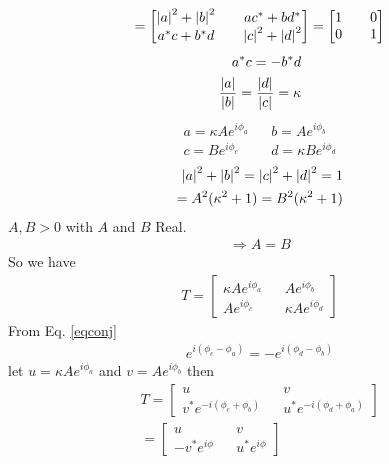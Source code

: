 \documentclass[12pt]{article}
\begin{document}
\begin{equation}
=\begin{bmatrix}
\abs{a}^2 + \abs{b}^2 && ac^*+bd^*\\
a^*c +b^*d && \abs{c}^2+\abs{d}^2
\end{bmatrix}=
\begin{bmatrix}
1 && 0\\
0 && 1
\end{bmatrix}
\end{equation}
\begin{align}
\label{eqconj}
a^*c = -b^*d\\
\frac{\abs{a}}{\abs{b}} = \frac{\abs{d}}{\abs{c}} = \kappa \\
\end{align}
\begin{align}
a = \kappa A e^{i \phi_a} && b = A e^{i \phi_b}\\
c =  B e^{i \phi_c} && d = \kappa B e^{i \phi_d}
\end{align}
\begin{align}
\abs{a}^2+\abs{b}^2 = \abs{c}^2 + \abs{d}^2 = 1\\
= A^2 (\kappa^2 + 1) = B^2(\kappa^2 + 1)\\
\end{align}
$A,B>0$ with $A$ and $B$ Real.
\begin{align}
\Rightarrow A = B
\end{align}
So we have
\begin{align}
T=
\begin{bmatrix}
\kappa A e^{i\phi_a} && A e^{i \phi_b}\\
A e^{i \phi_c} && \kappa A e^{i \phi_d}
\end{bmatrix}
\end{align}
From Eq. \ref{eqconj}
\begin{align}
e^{i(\phi_c-\phi_a)} = -e^{i(\phi_d-\phi_b)}
\end{align}
let $u=\kappa A e^{i\phi_a}$ and $v=Ae^{i\phi_b}$ then
\begin{align}
T=
\begin{bmatrix}
u && v\\
v^* e^{-i(\phi_c+\phi_b)} && u^* e^{-i(\phi_d+\phi_a)}
\end{bmatrix}\\
=
\begin{bmatrix}
u && v\\
-v^*e^{i \phi} && u^* e^{i\phi}
\end{bmatrix}
\end{align}
\end{document}
